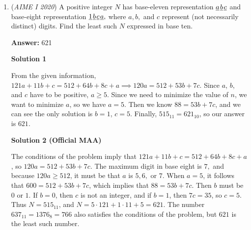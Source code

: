 \begin{enumerate}
 



\textbf{Solution 9}

Let the series be $a,ar,ar^2$. So, converting these logarithms into exponents we have $8^a = 2x$, $4^{ar} = x$, and $2^{ar^2} = x$. So, setting the 2nd and 3rd equations equal, we have:
 \[4^{ar} = 2^{ar^2} \Longrightarrow 2^{2ar} = 2^{ar^2} \Longrightarrow 2ar = ar^2 \Longrightarrow r = 2\]. Plugging that into our 3rd equation, we have $2^{4a} = x$. We recall that $8^a = 2x \Longrightarrow 2^{3a} = 2x$. So, since $2^{4a} = x$, $2x = 2^{4a+1}$. Now, setting $2^{3a}$, and $2^{4a+1}$ equal, we get $a = -1$, so plugging into our first equation, we have
 \[\dfrac{1}{8} = 2x \Longrightarrow x = \dfrac{1}{16} \Longrightarrow \boxed{017}\]

 -jb2015007

 


	\item (\textit{AIME I 2020}) A positive integer $N$ has base-eleven representation $\underline{a}\kern 0.1em\underline{b}\kern 0.1em\underline{c}$ and base-eight representation $\underline1\kern 0.1em\underline{b}\kern 0.1em\underline{c}\kern 0.1em\underline{a},$ where $a,b,$ and $c$ represent (not necessarily distinct) digits. Find the least such $N$ expressed in base ten.


 
 \textbf{Answer: }621



\textbf{Solution 1}

From the given information, $121a+11b+c=512+64b+8c+a \implies 120a=512+53b+7c$. Since $a$, $b$, and $c$ have to be positive, $a \geq 5$. Since we need to minimize the value of $n$, we want to minimize $a$, so we have $a = 5$. Then we know $88=53b+7c$, and we can see the only solution is $b=1$, $c=5$. Finally, $515_{11} = 621_{10}$, so our answer is $\boxed{621}$.

 



\textbf{Solution 2 (Official MAA)}

The conditions of the problem imply that $121a + 11b + c = 512 + 64b + 8 c + a$, so $120 a = 512+ 53b+7c$. The maximum digit in base eight is $7,$ and because $120a \ge 512$, it must be that $a$ is $5, 6,$ or $7.$ When $a = 5$, it follows that $600=512 + 53b+7c$, which implies that $88 = 53b+7c$. Then $b$ must be $0$ or $1.$ If $b = 0$, then $c$ is not an integer, and if $b = 1$, then $7c = 35$, so $c = 5$. Thus $N = 515_{11}$, and $N=5\cdot 121 + 1\cdot 11 + 5 = 621$. The number $637_{11} =1376_{8} = 766$ also satisfies the conditions of the problem, but $621$ is the least such number.


\end{enumerate}
